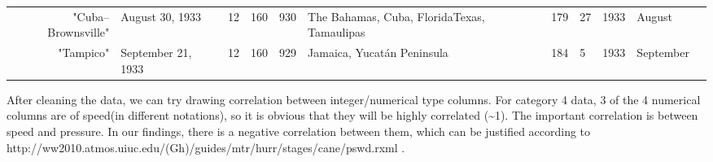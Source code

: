 \documentclass[11pt]{article}
\begin{document}
\begin{tabular}{r|llllllllll}
	 "Cuba–Brownsville"                                                    & August 30, 1933                                                       & 12                                                                    & 160                                                                   & 930                                                                   & The Bahamas, Cuba, FloridaTexas, Tamaulipas                           &  179                                                                  &  27                                                                   & 1933                                                                  & August                                                               \\
	 "Tampico"                                                             & September 21, 1933                                                    & 12                                                                    & 160                                                                   & 929                                                                   & Jamaica, Yucatán Peninsula                                            &  184                                                                  &   5                                                                   & 1933                                                                  & September                                                            \\
\end{tabular}


    
    After cleaning the data, we can try drawing correlation between
integer/numerical type columns. For category 4 data, 3 of the 4
numerical columns are of speed(in different notations), so it is obvious
that they will be highly correlated (\textasciitilde{}1). The important
correlation is between speed and pressure. In our findings, there is a
negative correlation between them, which can be justified according to
http://ww2010.atmos.uiuc.edu/(Gh)/guides/mtr/hurr/stages/cane/pswd.rxml
.
\end{document}
